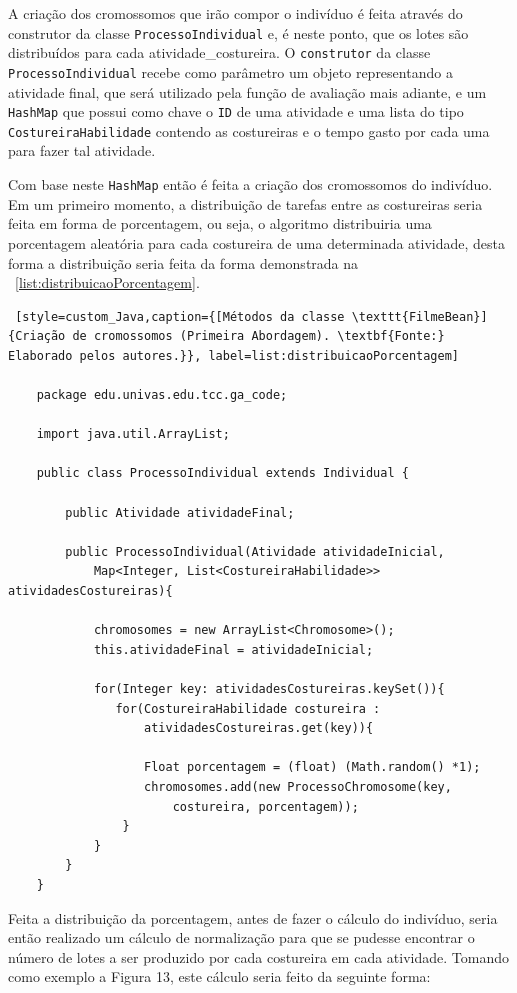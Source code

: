 \par A criação dos cromossomos que irão compor o indivíduo é feita através do construtor da classe 
\texttt{ProcessoIndividual} e, é neste ponto, que os lotes são distribuídos para
cada atividade\_costureira.
O \texttt{construtor} da classe \texttt{ProcessoIndividual} recebe como
parâmetro um objeto representando a atividade final, que será utilizado pela função de avaliação mais adiante, e um \texttt{HashMap} que possui como chave o
\texttt{ID} de uma atividade e uma lista do  tipo \texttt{CostureiraHabilidade} contendo as costureiras e o tempo 
gasto por cada uma para fazer tal atividade.

\par Com base neste \texttt{HashMap} então é feita a criação dos cromossomos do indivíduo.
Em um primeiro momento, a distribuição de tarefas entre as costureiras seria feita em forma 
de porcentagem, ou seja, o algoritmo distribuiria uma porcentagem aleatória para cada costureira de 
uma determinada atividade, desta forma a distribuição seria feita da forma
demonstrada na ~\ref{list:distribuicaoPorcentagem}.

\begin{lstlisting} [style=custom_Java,caption={[Métodos da classe \texttt{FilmeBean}]{Criação de cromossomos (Primeira Abordagem). \textbf{Fonte:} Elaborado pelos autores.}}, label=list:distribuicaoPorcentagem] 	

	package edu.univas.edu.tcc.ga_code;
	
	import java.util.ArrayList;
	
	public class ProcessoIndividual extends Individual {
		
		public Atividade atividadeFinal;
		
		public ProcessoIndividual(Atividade atividadeInicial,
			Map<Integer, List<CostureiraHabilidade>> atividadesCostureiras){
		
			chromosomes = new ArrayList<Chromosome>();
			this.atividadeFinal = atividadeInicial;
			
			for(Integer key: atividadesCostureiras.keySet()){
			   for(CostureiraHabilidade costureira : 
				   atividadesCostureiras.get(key)){
				
				   Float porcentagem = (float) (Math.random() *1);
				   chromosomes.add(new ProcessoChromosome(key, 
					   costureira, porcentagem));
				}
			}
		}
	}

\end{lstlisting}
 
\par Feita a distribuição da porcentagem, antes de fazer o cálculo do indivíduo, seria então realizado 
um cálculo de normalização para que se pudesse encontrar o número de lotes a ser
produzido por cada costureira em cada atividade. Tomando como exemplo a Figura
13, este cálculo seria feito da seguinte forma:

